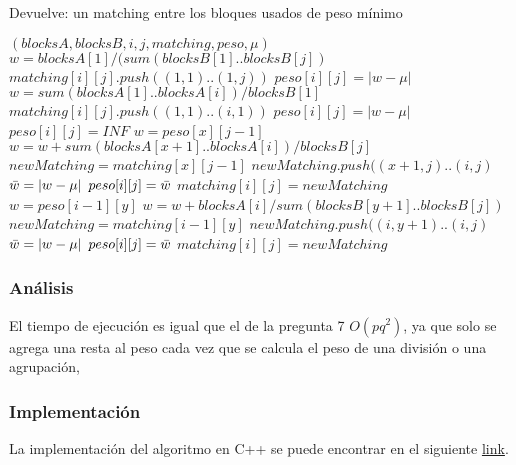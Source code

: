 Devuelve: un matching entre los bloques usados de peso mínimo
\begin{algorithmic}[1]
  $(blocksA,blocksB,i,j,matching,peso, \mu)$
    \STATE $w=blocksA[1]/(sum(blocksB[1]..blocksB[j])$
    \STATE $matching[i][j].push((1,1)..(1,j))$
    \STATE $peso[i][j] = |w - \mu|$
  \ENDIF
    \STATE $w=sum(blocksA[1]..blocksA[i])/blocksB[1]$
    \STATE $matching[i][j].push((1,1)..(i,1))$
    \STATE $peso[i][j] = |w - \mu|$
  \ELSE
    \STATE $peso[i][j] = INF$
        \STATE $w=peso[x][j-1]$
        \STATE $w=w+sum(blocksA[x+1]..blocksA[i])/blocksB[j]$
        \STATE $newMatching=matching[x][j-1]$
        \STATE $newMatching.push((x+1,j)..(i,j)$
        \STATE $\Bar{w} = |w - \mu|$
            \STATE $peso[i][j] = \Bar{w}$
            \STATE $matching[i][j] = newMatching$
        \ENDIF
    \ENDFOR
        \STATE $w=peso[i-1][y]$
        \STATE $w=w+blocksA[i]/sum(blocksB[y+1]..blocksB[j])$
        \STATE $newMatching=matching[i-1][y]$
        \STATE $newMatching.push((i,y+1)..(i,j)$
        \STATE $\Bar{w} = |w - \mu|$
            \STATE $peso[i][j] = \Bar{w}$
            \STATE $matching[i][j] = newMatching$
        \ENDIF
    \ENDFOR
    \ENDIF
\end{algorithmic}
\subsubsection*{Análisis}
El tiempo de ejecución es igual que el de la pregunta 7 $O(pq^2)$, ya que solo se agrega una resta al peso cada vez que se calcula el peso de una división o una agrupación,
\subsubsection*{Implementación}
La implementación del algoritmo en C++ se puede encontrar en el siguiente \href{https://github.com/Guillermo598/ProyectoADA/blob/master/Pregunta10.cpp}{link}.